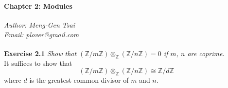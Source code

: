 \documentclass{article}
\begin{document}
\textbf{\Large Chapter 2: Modules} \\\\



\emph{Author: Meng-Gen Tsai} \\
\emph{Email: plover@gmail.com} \\\\






\textbf{Exercise 2.1}
\emph{Show that
$(\mathbb{Z}/m\mathbb{Z}) \otimes_{\mathbb{Z}} (\mathbb{Z}/n\mathbb{Z}) = 0$
if $m$, $n$ are coprime.} \\

It suffices to show that
$$(\mathbb{Z}/m\mathbb{Z}) \otimes_{\mathbb{Z}} (\mathbb{Z}/n\mathbb{Z})
\cong \mathbb{Z}/d\mathbb{Z}$$
where $d$ is the greatest common divisor of $m$ and $n$. \\
\end{document}
